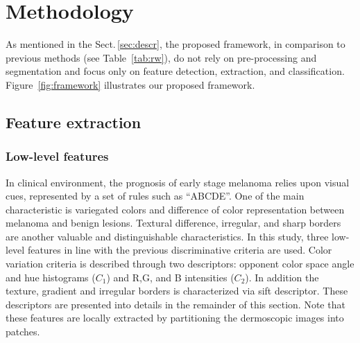 \section{Methodology}
\label{sec:method}
\graphicspath{ {./content/method/figures/} }
As mentioned in the Sect.\,\ref{sec:descr}, the proposed framework, in comparison to previous methods (see Table~\ref{tab:rw}), do not rely on pre-processing and segmentation and focus only on feature detection, extraction, and classification.
Figure~\ref{fig:framework} illustrates our proposed framework.


\subsection{Feature extraction}

\subsubsection{Low-level features}
In clinical environment, the prognosis of early stage melanoma relies upon visual cues, represented by a set of rules such as ``ABCDE''.
One of the main characteristic is variegated colors and difference of color representation between melanoma and benign lesions.
Textural difference, irregular, and sharp borders are another valuable and distinguishable characteristics. 
In this study, three low-level features in line with the previous discriminative criteria are used.
Color variation criteria is described through two descriptors: opponent color space angle and hue histograms ($C_{1}$) and R,G, and B intensities ($C_{2}$).
In addition the texture, gradient and irregular borders is characterized via \ac{sift} descriptor. 
These descriptors are presented into details in the remainder of this section.
Note that these features are locally extracted by partitioning the dermoscopic images into patches.

